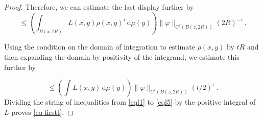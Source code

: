 \documentclass[10pt,a4paper]{article}
\theoremstyle{plain}
\theoremstyle{definition}
\numberwithin{equation}{subsection}
\begin{document}
\begin{proof}
Therefore, we can estimate the last display further by
       \begin{equation}\label{eql4}
         \le \left(\int_{B(x, tR)} L(x,y)
          \rho(x,y)^\tau \, \mathrm{d}\mu(y) \right)\|\varphi\|_{C^\tau(B(z, 2R))}(2R)^{-\tau}\, .
    \end{equation}

  Using the condition on the domain of integration to estimate $\rho(x,y)$ by $tR$ and then expanding the domain by positivity of the integrand, we estimate this further by

   \begin{equation}\label{eql5}
         \le \left(\int L(x,y) \, \mathrm{d}\mu(y)\right)
         \|\varphi\|_{C^\tau(B(z, 2R))} (t/2)^{\tau} \, .
    \end{equation}
 Dividing the string of inequalities from \eqref{eql1} to
\eqref{eql5} by the positive integral of $L$ proves \eqref{eq-firstt}.



\end{proof}
\end{document}
